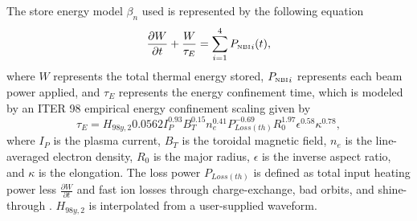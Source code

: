 \documentclass[12pt,lot, lof]{puthesis}
\begin{document}
The store energy model $\beta_n$ used is represented by the following equation
\begin{equation}
\frac{\partial W}{\partial t}
   + \frac{W}{\tau_E}  =\sum_{i=1}^{4}{P_\textrm{\tiny{NBI}}}_i(t),
\label{energy}
\end{equation}
where $W$ represents the total thermal energy stored, ${P_\textrm{\tiny{NBI}}}_i$ represents each beam power applied, and ${\tau_E} $ represents the energy confinement time, which is modeled by an ITER 98 empirical energy confinement scaling \cite{Iter99} given by
\begin{equation}
\tau_E = H_{98y,2} 0.0562 I_{P}^{0.93} B_{T}^{0.15} n_{e}^{0.41} P_{Loss(th)}^{-0.69} R_{0}^{1.97} {\epsilon}^{0.58} \kappa^{0.78},
\end{equation}
where $I_P$ is the plasma current, $B_T$ is the toroidal magnetic field, $n_e$ is the line-averaged electron density, $R_0$ is the major radius, $\epsilon$ is the inverse aspect ratio, and $\kappa$ is the elongation. The loss power $P_{Loss(th)}$ is defined as total input heating power less $\frac{\partial W}{\partial t}$ and fast ion losses through charge-exchange, bad orbits, and shine-through \cite{Kaye06}.
$H_{98y,2} $ is interpolated from a user-supplied waveform.
\end{document}
